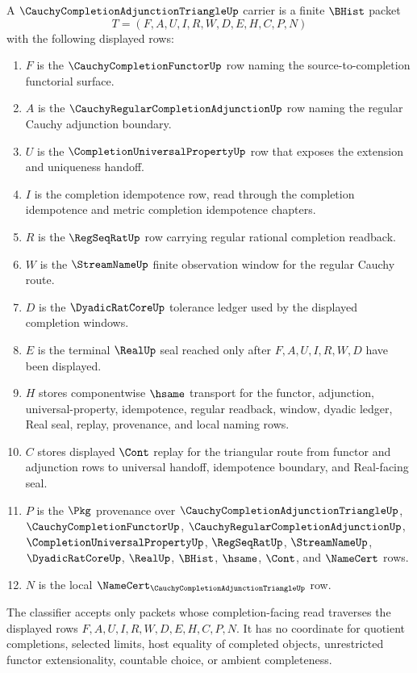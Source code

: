 \begin{definition}
\label{def:cauchy-completion-adjunction-triangle-carrier}
A $\CauchyCompletionAdjunctionTriangleUp$ carrier is a finite $\BHist$ packet
$$
T=(F,A,U,I,R,W,D,E,H,C,P,N)
$$
with the following displayed rows:
\begin{enumerate}
\item $F$ is the $\CauchyCompletionFunctorUp$ row naming the source-to-completion functorial surface.
\item $A$ is the $\CauchyRegularCompletionAdjunctionUp$ row naming the regular Cauchy adjunction boundary.
\item $U$ is the $\CompletionUniversalPropertyUp$ row that exposes the extension and uniqueness handoff.
\item $I$ is the completion idempotence row, read through the completion idempotence and metric completion idempotence chapters.
\item $R$ is the $\RegSeqRatUp$ row carrying regular rational completion readback.
\item $W$ is the $\StreamNameUp$ finite observation window for the regular Cauchy route.
\item $D$ is the $\DyadicRatCoreUp$ tolerance ledger used by the displayed completion windows.
\item $E$ is the terminal $\RealUp$ seal reached only after $F,A,U,I,R,W,D$ have been displayed.
\item $H$ stores componentwise $\hsame$ transport for the functor, adjunction, universal-property, idempotence, regular readback, window, dyadic ledger, Real seal, replay, provenance, and local naming rows.
\item $C$ stores displayed $\Cont$ replay for the triangular route from functor and adjunction rows to universal handoff, idempotence boundary, and Real-facing seal.
\item $P$ is the $\Pkg$ provenance over $\CauchyCompletionAdjunctionTriangleUp$, $\CauchyCompletionFunctorUp$, $\CauchyRegularCompletionAdjunctionUp$, $\CompletionUniversalPropertyUp$, $\RegSeqRatUp$, $\StreamNameUp$, $\DyadicRatCoreUp$, $\RealUp$, $\BHist$, $\hsame$, $\Cont$, and $\NameCert$ rows.
\item $N$ is the local $\NameCert_{\CauchyCompletionAdjunctionTriangleUp}$ row.
\end{enumerate}
The classifier accepts only packets whose completion-facing read traverses the displayed rows $F,A,U,I,R,W,D,E,H,C,P,N$. It has no coordinate for quotient completions, selected limits, host equality of completed objects, unrestricted functor extensionality, countable choice, or ambient completeness.
\end{definition}


